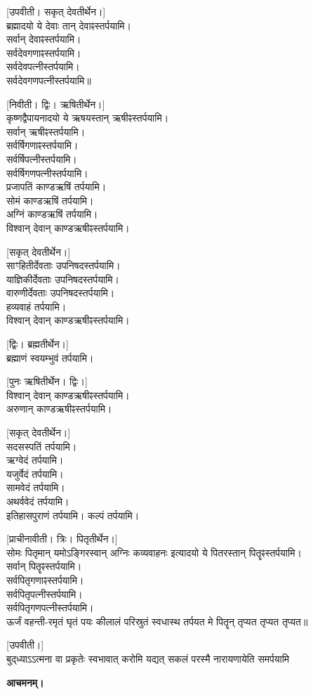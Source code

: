 \vspace{-1ex}
{\scriptsize [उपवीती। सकृत् देवतीर्थेन।]}\\
ब्रह्मादयो ये देवाः तान् देवाꣴस्तर्पयामि।\\
सर्वान् देवाꣴस्तर्पयामि।\\
सर्वदेवगणाꣴस्तर्पयामि।\\
सर्वदेवपत्नीस्तर्पयामि।\\
सर्वदेवगणपत्नीस्तर्पयामि॥

{\scriptsize [निवीती। द्विः। ऋषितीर्थेन।]}\\
कृष्णद्वैपायनादयो ये ऋषयस्तान् ऋषीꣴस्तर्पयामि।\\
सर्वान् ऋषीꣴस्तर्पयामि।\\
सर्वर्षिगणाꣴस्तर्पयामि।\\
सर्वर्षिपत्नीस्तर्पयामि।\\
सर्वर्षिगणपत्नीस्तर्पयामि।\\
प्रजापतिं काण्डऋषिं तर्पयामि।\\
सोमं काण्डऋषिं तर्पयामि।\\
अग्निं काण्डऋषिं तर्पयामि।\\
विश्वान् देवान् काण्डऋषीꣴस्तर्पयामि।
\pagebreak[4]

{\scriptsize [सकृत् देवतीर्थेन।]}\\
साꣳहितीर्देवताः उपनिषदस्तर्पयामि।\\
याज्ञिकीर्देवताः उपनिषदस्तर्पयामि।\\
वारुणीर्देवताः उपनिषदस्तर्पयामि।\\
हव्यवाहं तर्पयामि।\\
विश्वान् देवान् काण्डऋषीꣴस्तर्पयामि।

{\scriptsize [द्विः। ब्रह्मतीर्थेन।]}\\
ब्रह्माणं स्वयम्भुवं तर्पयामि।

{\scriptsize [पुनः ऋषितीर्थेन। द्विः।]}\\
विश्वान् देवान् काण्डऋषीꣴस्तर्पयामि।\\
अरुणान् काण्डऋषीꣴस्तर्पयामि।

{\scriptsize [सकृत् देवतीर्थेन।]}\\
सदसस्पतिं तर्पयामि।\\
ऋग्वेदं तर्पयामि।\\
यजुर्वेदं तर्पयामि।\\
सामवेदं तर्पयामि।\\
अथर्ववेदं तर्पयामि।\\
इतिहासपुराणं तर्पयामि। कल्पं तर्पयामि।

{\scriptsize [प्राचीनावीती। त्रिः। पितृतीर्थेन।]}\\
सोमः पितृमान् यमोऽङ्गिरस्वान् अग्निः कव्यवाहनः इत्यादयो ये पितरस्तान् पितॄꣴस्तर्पयामि।\\
सर्वान् पितॄꣴस्तर्पयामि।\\
सर्वपितृगणाꣴस्तर्पयामि।\\
सर्वपितृ\-पत्नीस्तर्पयामि।\\
सर्वपितृ\-गण\-पत्नीस्तर्पयामि।\\
ऊर्जं वहन्ती-रमृतं घृतं पयः कीलालं परिस्रुतं स्वधास्थ तर्पयत मे पितॄन् तृप्यत तृप्यत तृप्यत॥

{\scriptsize [उपवीती।]}\\
\vspace{-3ex}
{बुद्‌ध्याऽऽत्मना वा प्रकृतेः स्वभावात्}
{करोमि यद्यत् सकलं परस्मै}
{नारायणायेति समर्पयामि}

\textbf{आचमनम्।}

